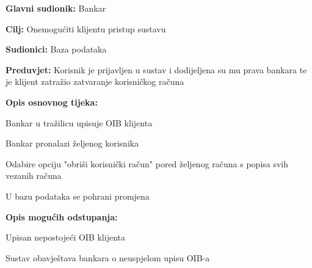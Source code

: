             	\noindent {}
            	\begin{packed_item}
            		
            		\item \textbf{Glavni sudionik: }Bankar
            		\item  \textbf{Cilj:} Onemogućiti klijentu pristup sustavu
            		\item  \textbf{Sudionici:} Baza podataka
            		\item  \textbf{Preduvjet:} Korisnik je prijavljen u sustav i dodijeljena su mu prava bankara te je klijent zatražio zatvaranje korisničkog računa
            		\item  \textbf{Opis osnovnog tijeka:}
            		
            		\item[] \begin{packed_enum}
            			
            			\item Bankar u tražilicu upisuje OIB klijenta
            			\item Bankar pronalazi željenog korisnika
            			\item Odabire opciju "obriši korisnički račun" pored željenog računa s popisa svih vezanih računa
            			\item U bazu podataka se pohrani promjena
            		\end{packed_enum}
            		
            		\item  \textbf{Opis mogućih odstupanja:} 
            		
            		\item[] \begin{packed_item}
            			
            			\item[1.a] Upisan nepostojeći OIB klijenta
            			\item[] \begin{packed_enum}
            				
            				\item Sustav obavještava bankara o neuspjelom upisu OIB-a
            				
            			\end{packed_enum}
            			
            		\end{packed_item}
            	\end{packed_item}            
            
